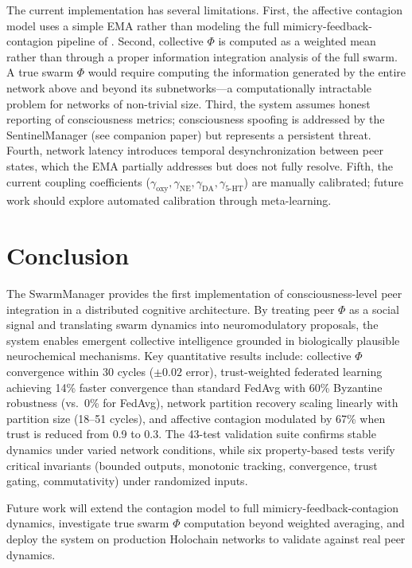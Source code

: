 \documentclass[11pt,a4paper]{article}
\begin{document}
The current implementation has several limitations. First, the affective contagion model uses a simple EMA rather than modeling the full mimicry-feedback-contagion pipeline of \citet{hatfield1993}. Second, collective $\Phi$ is computed as a weighted mean rather than through a proper information integration analysis of the full swarm. A true swarm $\Phi$ would require computing the information generated by the entire network above and beyond its subnetworks---a computationally intractable problem for networks of non-trivial size. Third, the system assumes honest reporting of consciousness metrics; consciousness spoofing is addressed by the SentinelManager (see companion paper) but represents a persistent threat. Fourth, network latency introduces temporal desynchronization between peer states, which the EMA partially addresses but does not fully resolve. Fifth, the current coupling coefficients ($\gamma_{\text{oxy}}, \gamma_{\text{NE}}, \gamma_{\text{DA}}, \gamma_{\text{5-HT}}$) are manually calibrated; future work should explore automated calibration through meta-learning.

\section{Conclusion}

The SwarmManager provides the first implementation of consciousness-level peer integration in a distributed cognitive architecture. By treating peer $\Phi$ as a social signal and translating swarm dynamics into neuromodulatory proposals, the system enables emergent collective intelligence grounded in biologically plausible neurochemical mechanisms. Key quantitative results include: collective $\Phi$ convergence within 30 cycles ($\pm 0.02$ error), trust-weighted federated learning achieving 14\% faster convergence than standard FedAvg with 60\% Byzantine robustness (vs.\ 0\% for FedAvg), network partition recovery scaling linearly with partition size (18--51 cycles), and affective contagion modulated by 67\% when trust is reduced from 0.9 to 0.3. The 43-test validation suite confirms stable dynamics under varied network conditions, while six property-based tests verify critical invariants (bounded outputs, monotonic tracking, convergence, trust gating, commutativity) under randomized inputs.

Future work will extend the contagion model to full mimicry-feedback-contagion dynamics, investigate true swarm $\Phi$ computation beyond weighted averaging, and deploy the system on production Holochain networks to validate against real peer dynamics.
\end{document}
